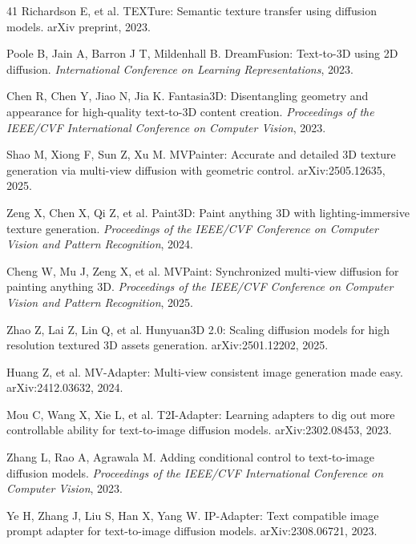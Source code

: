 \documentclass[times,twocolumn,final]{elsarticle}
\providecommand{\DIFadd}[1]{{\protect\color{blue} \sf #1}} %
\providecommand{\DIFaddbegin}{} %
\providecommand{\DIFaddend}{} %
\newcommand{\DIFaddincludegraphics}[2][]{{\color{blue}\fbox{\DIFOincludegraphics[#1]{#2}}}} %
\DeclareRobustCommand{\DIFaddbegin}{\DIFOaddbegin \let\includegraphics\DIFaddincludegraphics} %
\DeclareRobustCommand{\DIFaddend}{\DIFOaddend \let\includegraphics\DIFOincludegraphics} %
\begin{document}
\begin{thebibliography}{41}
Richardson E, et al. TEXTure: Semantic texture transfer using diffusion models. arXiv preprint, 2023.

Poole B, Jain A, Barron J T, Mildenhall B. DreamFusion: Text-to-3D using 2D diffusion. \textit{International Conference on Learning Representations}, 2023.

Chen R, Chen Y, Jiao N, Jia K. Fantasia3D: Disentangling geometry and appearance for high-quality text-to-3D content creation. \textit{Proceedings of the IEEE/CVF International Conference on Computer Vision}, 2023.

\DIFaddbegin {}
\DIFadd{Shao M, Xiong F, Sun Z, Xu M. MVPainter: Accurate and detailed 3D texture generation via multi-view diffusion with geometric control. arXiv:2505.12635, 2025.
}

\DIFadd{Zeng X, Chen X, Qi Z, et al. Paint3D: Paint anything 3D with lighting-immersive texture generation. \textit{Proceedings of the IEEE/CVF Conference on Computer Vision and Pattern Recognition}, 2024.
}

\DIFadd{Cheng W, Mu J, Zeng X, et al. MVPaint: Synchronized multi-view diffusion for painting anything 3D. \textit{Proceedings of the IEEE/CVF Conference on Computer Vision and Pattern Recognition}, 2025.
}

\DIFadd{Zhao Z, Lai Z, Lin Q, et al. Hunyuan3D 2.0: Scaling diffusion models for high resolution textured 3D assets generation. arXiv:2501.12202, 2025.
}

\DIFadd{Huang Z, et al. MV-Adapter: Multi-view consistent image generation made easy. arXiv:2412.03632, 2024.
}

\DIFadd{Mou C, Wang X, Xie L, et al. T2I-Adapter: Learning adapters to dig out more controllable ability for text-to-image diffusion models. arXiv:2302.08453, 2023.
}

\DIFaddend {}
Zhang L, Rao A, Agrawala M. Adding conditional control to text-to-image diffusion models. \textit{Proceedings of the IEEE/CVF International Conference on Computer Vision}, 2023.

Ye H, Zhang J, Liu S, Han X, Yang W. IP-Adapter: Text compatible image prompt adapter for text-to-image diffusion models. arXiv:2308.06721, 2023.


\end{thebibliography}
\end{document}
